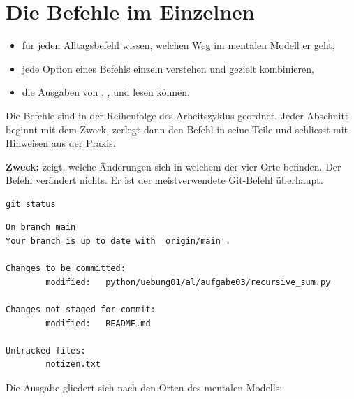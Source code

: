 \chapter{Die Befehle im Einzelnen}
\label{kap:befehle}

\begin{lernziele}
\begin{itemize}[nosep]
  \item für jeden Alltagsbefehl wissen, welchen Weg im mentalen Modell er geht,
  \item jede Option eines Befehls einzeln verstehen und gezielt kombinieren,
  \item die Ausgaben von , ,  und  lesen können.
\end{itemize}
\end{lernziele}

Die Befehle sind in der Reihenfolge des Arbeitszyklus geordnet. Jeder Abschnitt beginnt mit
dem Zweck, zerlegt dann den Befehl in seine Teile und schliesst mit Hinweisen aus der Praxis.


\textbf{Zweck:} zeigt, welche Änderungen sich in welchem der vier Orte befinden. Der Befehl
verändert nichts. Er ist der meistverwendete Git-Befehl überhaupt.

\begin{lstlisting}[style=befehle]
git status
\end{lstlisting}

\begin{lstlisting}[style=ausgabe]
On branch main
Your branch is up to date with 'origin/main'.

Changes to be committed:
        modified:   python/uebung01/al/aufgabe03/recursive_sum.py

Changes not staged for commit:
        modified:   README.md

Untracked files:
        notizen.txt
\end{lstlisting}

Die Ausgabe gliedert sich nach den Orten des mentalen Modells:

